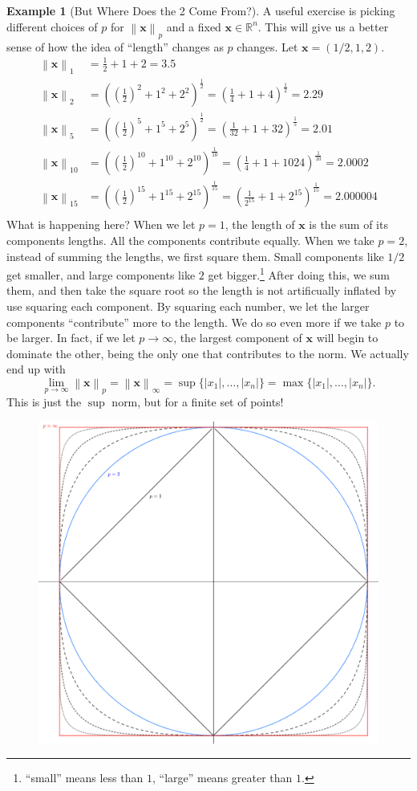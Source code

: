 \documentclass{article}
\newcommand{\R}{\mathbb{R}}
\newcommand{\x}{\mathbf{x}}
\newcommand{\norm}[1]{\left\lVert#1\right\rVert}
\theoremstyle{definition}
\newtheorem{example}{Example}[section]
\begin{document}
\begin{example}[But Where Does the 2 Come From?]
	A useful exercise is picking different choices of $ p $ for $ \norm{\x}_p $ and a fixed $ \x\in\R^n $. This will give us a better sense of how the idea of ``length'' changes as $ p $ changes. Let $ \x=(1/2,1,2) $.  
	\begin{align*}
		\norm{\x}_1&=\frac{1}{2}+1+2=3.5\\
		\norm{\x}_2&=\left(\left(\frac{1}{2}\right)^2+1^2+2^2\right)^\frac{1}{2}=\left(\frac{1}{4}+1+4\right)^\frac{1}{2}=2.29\\
		\norm{\x}_5&=\left(\left(\frac{1}{2}\right)^5+1^5+2^5\right)^\frac{1}{2}=\left(\frac{1}{32}+1+32\right)^\frac{1}{5}=2.01\\
		\norm{\x}_{10}&=\left(\left(\frac{1}{2}\right)^{10}+1^{10}+2^{10}\right)^\frac{1}{{10}}=\left(\frac{1}{4}+1+1024\right)^\frac{1}{{10}}=2.0002\\
		\norm{\x}_{15}&=\left(\left(\frac{1}{2}\right)^{15}+1^{15}+2^{15}\right)^\frac{1}{{15}}=\left(\frac{1}{2^{15}}+1+2^{15}\right)^\frac{1}{{15}}=2.000004\\
	\end{align*}  
	What is happening here? When we let $ p=1 $, the length of $ \x $ is the sum of its components lengths. All the components contribute equally. When we take $ p=2 $, instead of summing the lengths, we first square them. Small components like $ 1/2 $ get smaller, and large components like $ 2 $ get bigger.\footnote{``small'' means less than $ 1 $, ``large'' means greater than $ 1 $.} After doing this, we sum them, and then take the square root so the length is not artificually inflated by use squaring each component. By squaring each number, we let the larger components ``contribute'' more to the length. We do so even more if we take $ p $ to be larger. In fact, if we let $ p\to\infty $, the largest component of $ \x $ will begin to dominate the other, being the only one that contributes to the norm. We actually end up with $$ \lim\limits_{p\to\infty}\norm{\x}_p=\norm{\x}_\infty=\sup\{|x_1|,\ldots, |x_n|\}=\max\{|x_1|,\ldots, |x_n|\}. $$ This is just the $ \sup $ norm, but for a finite set of points! 
	\begin{figure}[h!]
		\centering
		\includegraphics[width=0.7\linewidth]{figures/lp_norm}
		\caption{}
		\label{fig:lpnorm}
	\end{figure}
	

\end{example}
\end{document}
